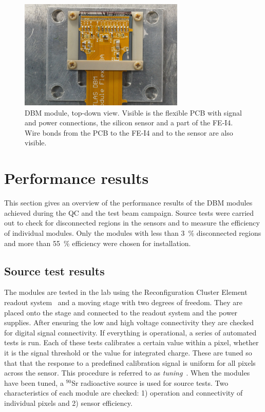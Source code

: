 \begin{figure}[!t]
\centering
\includegraphics[width=0.7\textwidth]{04_charge_monitoring/pics/mod1}
\caption{DBM module, top-down view. Visible is the flexible PCB with signal and power connections, the silicon sensor and a part of the FE-I4. Wire bonds from the PCB to the FE-I4 and to the sensor are also visible.}
\label{fig:completedmod}
\end{figure}



\section{Performance results}
\label{sec:perfresults}
This section gives an overview of the performance results of the DBM modules achieved during the QC and the test beam campaign. Source tests were carried out to check for disconnected regions in the sensors and to measure the efficiency of individual modules. Only the modules with less than 3~\% disconnected regions and more than 55~\% efficiency were chosen for installation. 


\subsection{Source test results}
The modules are tested in the lab using the Reconfiguration Cluster Element readout system~\cite{Claus:2021543} and a moving stage with two degrees of freedom. They are placed onto the stage and connected to the readout system and the power supplies. After ensuring the low and high voltage connectivity they are checked for digital signal connectivity. If everything is operational, a series of automated tests is run. Each of these tests calibrates a certain value within a pixel, whether it is the signal threshold or the value for integrated charge. These are tuned so that that the response to a predefined calibration signal is uniform for all pixels across the sensor. This procedure is referred to as \emph{tuning}~\cite{ATLIBL:00001}. When the modules have been tuned, a $^{90}$Sr radioactive source is used for source tests. Two characteristics of each module are checked: 1) operation and connectivity of individual pixels and 2) sensor efficiency. 

